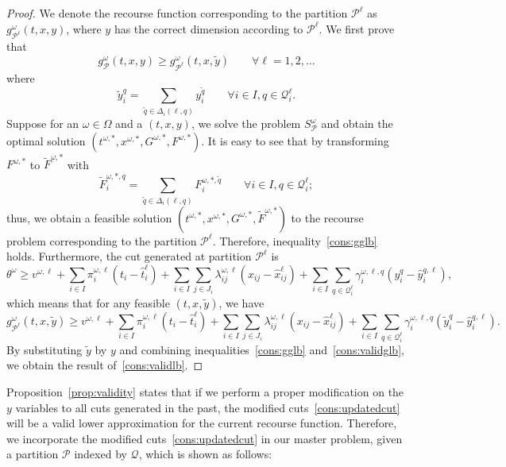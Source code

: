 \documentclass[11pt]{article}
\newcommand{\noi}{\noindent}
\begin{document}
	\begin{proof}
		We denote the recourse function corresponding to the partition \(\mathcal{P}^{\ell}\) as \(g^\omega_{\mathcal{P}^\ell}(t,x,y)\), where \(y\) has the correct dimension according to \(\mathcal{P}^\ell\). We first prove that 
		\begin{equation} \label{cons:gglb}
			g^\omega_{\mathcal{P}}(t,x,y) \geq g^{\omega}_{\mathcal{P}^\ell}(t,x,\tilde{y}) \qquad \forall \ell = 1,2,\dots
		\end{equation}
		where \[\tilde{y}_i^{q} =  \sum_{\tilde{q} \in \Delta_i(\ell,q)} y_i^{\tilde{q}} \qquad  \forall i \in I, q \in \mathcal{Q}^\ell_i. \]
		Suppose for an \(\omega \in \Omega\) and a \((t,x,y)\), we solve the problem \(S_{\mathcal{P}}^\omega\) and obtain the optimal solution \((t^{\omega,*},x^{\omega,*},G^{\omega,*},F^{\omega,*})\). It is easy to see that by transforming \(F^{\omega,*}\) to \(\tilde{F}^{\omega,*}\) with \[\tilde{F}^{\omega,*,q}_i = \sum_{\tilde{q} \in \Delta_i(\ell,q) }F_i^{\omega,*,\tilde{q}} \qquad  \forall i \in I, q \in \mathcal{Q}^\ell_i;\]
		thus, we obtain a feasible solution \((t^{\omega,*},x^{\omega,*},G^{\omega,*},\tilde{F}^{\omega,*})\) to the recourse problem corresponding to the partition \(\mathcal{P}^\ell\). Therefore, inequality~\eqref{cons:gglb} holds. Furthermore, the cut generated at partition \(\mathcal{P}^\ell\) is
		\[\theta^\omega \geq v^{\omega,\ell} + \sum_{i \in I} \pi_i^{\omega,\ell} (t_i - \hat{t}_i^{\ell}) + \sum_{i \in I} \sum_{j \in J_i} \lambda_{ij}^{\omega,\ell} (x_{ij} - \hat{x}_{ij}^{\ell}) + \sum_{i \in I} \sum_{q \in \mathcal{Q}^{\ell}_i} \gamma_{i}^{\omega,\ell,q} \left( y_i^{q} - \hat{y}_i^{q,\ell} \right),\]
		 which means that for any feasible \((t,x,\tilde{y})\), we have 
		 \begin{equation} \label{cons:validglb}
		 	g^\omega_{\mathcal{P}^\ell}(t,x,\tilde{y}) \geq v^{\omega,\ell} + \sum_{i \in I} \pi_i^{\omega,\ell} (t_i - \hat{t}_i^{\ell}) + \sum_{i \in I} \sum_{j \in J_i} \lambda_{ij}^{\omega,\ell} (x_{ij} - \hat{x}_{ij}^{\ell}) + \sum_{i \in I} \sum_{q \in \mathcal{Q}^{\ell}_i} \gamma_{i}^{\omega,\ell,q} \left( \tilde{y}_i^{q} - \hat{y}_i^{q,\ell} \right).
		 \end{equation}
		 By substituting \(\tilde{y}\) by \(y\) and combining inequalities~\eqref{cons:gglb} and~\eqref{cons:validglb}, we obtain the result of~\eqref{cons:validlb}.
	\end{proof}
	\noi Proposition~\ref{prop:validity} states that if we perform a proper modification on the \(y\) variables to all cuts generated in the past, the modified cuts~\eqref{cons:updatedcut} will be a valid lower approximation for the current recourse function. Therefore, we incorporate the modified cuts~\eqref{cons:updatedcut} in our master problem, given a partition \(\mathcal{P}\) indexed by \(\mathcal{Q}\), which is shown as follows:
\end{document}
